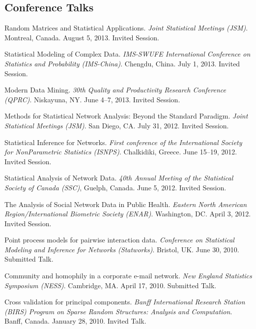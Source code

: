 \documentclass[10pt,letterpaper]{article}
\renewenvironment{itemize}{
  \begin{list}{}{
    \setlength{\leftmargin}{1.5em}
    \setlength{\itemsep}{0.25em}
    \setlength{\parskip}{0pt}
    \setlength{\parsep}{0.25em}
  }
}{
  \end{list}
}
\begin{document}
\subsection*{Conference Talks}
\begin{itemize}
\item Random Matrices and Statistical Applications.
  \textit{Joint Statistical Meetings (JSM)}.
  Montreal, Canada.
  August 5, 2013.
  Invited Session.

\item Statistical Modeling of Complex Data.
  \textit{IMS-SWUFE International Conference on Statistics and Probability (IMS-China)}.
  Chengdu, China.
  July 1, 2013.
  Invited Session.

\item Modern Data Mining.
  \textit{30th Quality and Productivity Research Conference (QPRC)}.
  Niskayuna, NY.
  June 4--7, 2013.
  Invited Session.

\item Methods for Statistical Network Analysis: Beyond the Standard Paradigm.
  \textit{Joint Statistical Meetings (JSM)}.
  San Diego, CA.
  July 31, 2012.
  Invited Session.

\item Statistical Inference for Networks. 
  \textit{First conference of the International Society for NonParametric Statistics (ISNPS)}.
  Chalkidiki, Greece.
  June 15--19, 2012.
  Invited Session.

\item Statistical Analysis of Network Data.
  \textit{40th Annual Meeting of the Statistical Society of Canada (SSC)},
  Guelph, Canada.
  June 5, 2012.
  Invited Session.

\item The Analysis of Social Network Data in Public Health.
  \textit{Eastern North American Region/International Biometric Society (ENAR)}.
  Washington, DC.
  April 3, 2012.
  Invited Session.

\item Point process models for pairwise interaction data.
  \textit{Conference on Statistical Modeling and Inference for Networks (Statworks)}.
  Bristol, UK.
  June 30, 2010.
  Submitted Talk.

\item Community and homophily in a corporate e-mail network.
  \textit{New England Statistics Symposium (NESS)}.
  Cambridge, MA.
  April 17, 2010.
  Submitted Talk.

\item Cross validation for principal components.
  \textit{Banff International Research Station (BIRS) Program on Sparse Random Structures: Analysis and Computation}.
  Banff, Canada.
  January 28, 2010.
  Invited Talk.
\end{itemize}
\end{document}
